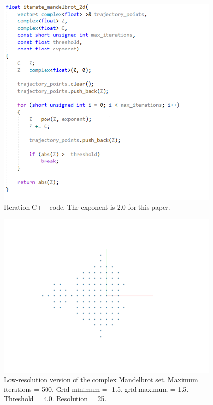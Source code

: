 \documentclass[12pt]{article}
\begin{document}
\begin{figure} 
\centering
  \includegraphics[width = 5 in]{code1.png}	
  \caption{Iteration C++ code.
The exponent is 2.0 for this paper.
}
\end{figure}

\begin{figure} 
\centering
  \includegraphics[width = 5 in]{set1.png}	
  \caption{Low-resolution version of the complex Mandelbrot set.
Maximum iterations = 500.
Grid minimum = -1.5, grid maximum = 1.5.
Threshold = 4.0.
Resolution = 25.
}
\end{figure}
\end{document}

